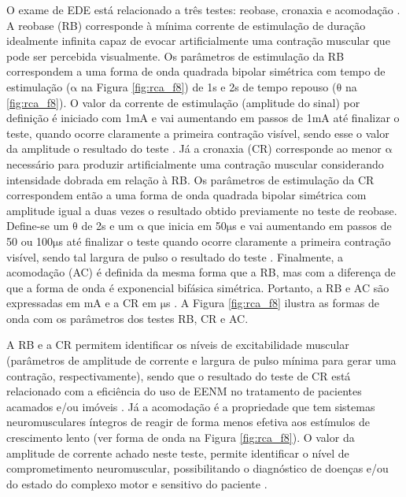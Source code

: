 O exame de \acrshort{EDE} está relacionado a três testes: reobase, cronaxia e acomodação \cite{Russo2004}. A reobase (\acrshort{RB}) corresponde à mínima corrente de estimulação de duração idealmente infinita capaz de evocar artificialmente uma contração muscular que pode ser percebida visualmente. Os parâmetros de estimulação da \acrshort{RB} correspondem a uma forma de onda quadrada bipolar simétrica com tempo de estimulação ($\mathrm{\alpha}$ na Figura \ref{fig:rca_f8}) de 1s e 2s de tempo repouso ($\mathrm{\theta}$ na \ref{fig:rca_f8}). O valor da corrente de estimulação (amplitude do sinal) por definição é iniciado com 1mA e vai aumentando em passos de 1mA até finalizar o teste, quando ocorre claramente a primeira contração visível, sendo esse o valor da amplitude o resultado do teste \cite{Irnich2010, Pieber2015}. Já a cronaxia (\acrshort{CR}) corresponde ao menor $\mathrm{\alpha}$ necessário para produzir artificialmente uma contração muscular considerando intensidade dobrada em relação à \acrshort{RB}. Os parâmetros de estimulação da \acrshort{CR} correspondem então a uma forma de onda quadrada bipolar simétrica com amplitude igual a duas vezes o resultado obtido previamente no teste de reobase. Define-se um $\mathrm{\theta}$ de 2s e um $\mathrm{\alpha}$ que inicia em 50$\mathrm{\mu}$s e vai aumentando em passos de 50 ou 100$\mathrm{\mu}$s até finalizar o teste quando ocorre claramente a primeira contração visível, sendo tal largura de pulso o resultado do teste \cite{Irnich2010, Pieber2015}. Finalmente, a acomodação (\acrshort{AC}) é definida da mesma forma que a \acrshort{RB}, mas com a diferença de que a forma de onda é exponencial bifásica simétrica. Portanto, a \acrshort{RB} e \acrshort{AC} são expressadas em mA e a \acrshort{CR} em $\mathrm{\mu}$s \cite{Russo2004}. A Figura \ref{fig:rca_f8} ilustra as formas de onda com os parâmetros dos testes \acrshort{RB}, \acrshort{CR} e \acrshort{AC}. 

A \acrshort{RB} e a \acrshort{CR} permitem identificar os níveis de excitabilidade muscular (parâmetros de amplitude de corrente e largura de pulso mínima para gerar uma contração, respectivamente), sendo que o resultado do teste de \acrshort{CR} está relacionado com a eficiência do uso de \acrshort{EENM} no tratamento de pacientes acamados e/ou imóveis \cite{Naki2011, Martin2014}. Já a acomodação é a propriedade que tem sistemas neuromusculares íntegros de reagir de forma menos efetiva aos estímulos de crescimento lento (ver forma de onda na Figura \ref{fig:rca_f8}). O valor da amplitude de corrente achado neste teste, permite identificar o nível de comprometimento neuromuscular, possibilitando o diagnóstico de doenças e/ou do estado do complexo motor e sensitivo do paciente \cite{Sabater2012}.

